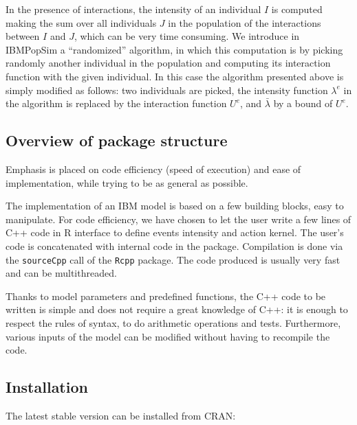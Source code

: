 In the presence of interactions, the intensity of an individual \(I\) is computed making the sum over all individuals \(J\) in the population of the interactions between \(I\) and \(J\), which can be very time consuming.
We introduce in IBMPopSim a ``randomized'' algorithm, in which this computation is by picking randomly another individual in the population and computing its interaction function with the given individual. In this case the algorithm presented above is simply modified as follows: two individuals are picked, the intensity function \(\lambda^e\) in the algorithm is replaced by the interaction function \(U^e\), and \(\bar \lambda\) by a bound of \(U^e\).

\hypertarget{overview-of-package-structure}{%
\subsection{Overview of package structure}\label{overview-of-package-structure}}

Emphasis is placed on code efficiency (speed of execution) and ease of implementation, while trying to be as general as possible.

The implementation of an IBM model is based on a few building blocks, easy to manipulate. For code efficiency, we have chosen to let the user write a few lines of C++ code in R interface to define events intensity and action kernel. The user's code is concatenated with internal code in the package. Compilation is done via the \texttt{sourceCpp} call of the \texttt{Rcpp} package. The code produced is usually very fast and can be multithreaded.

Thanks to model parameters and predefined functions, the C++ code to be written is simple and does not require a great knowledge of C++: it is enough to respect the rules of syntax, to do arithmetic operations and tests. Furthermore, various inputs of the model can be modified without having to recompile the code.

\hypertarget{installation}{%
\subsection{Installation}\label{installation}}

The latest stable version can be installed from CRAN:

\begin{Shaded}
\begin{Highlighting}[]
\NormalTok{(}\NormalTok{)}
\end{Highlighting}
\end{Shaded}

